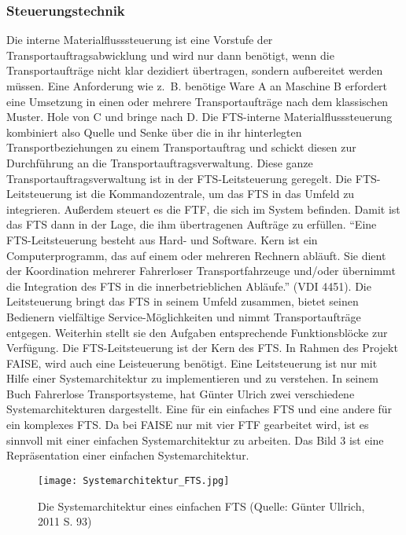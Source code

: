 \subsubsection{Steuerungstechnik}
Die interne Materialflusssteuerung ist eine Vorstufe der Transportauftragsabwicklung und wird nur dann ben\"otigt, wenn die Transportauftr\"age nicht klar dezidiert \"ubertragen, sondern aufbereitet werden m\"ussen.
Eine Anforderung wie z.~B. ben\"otige Ware A an Maschine B erfordert eine Umsetzung in einen oder mehrere Transportauftr\"age nach dem klassischen Muster.
Hole von C und bringe nach D.
Die FTS-interne Materialflusssteuerung kombiniert also Quelle und Senke \"uber die in ihr hinterlegten Transportbeziehungen zu einem Transportauftrag und schickt diesen zur Durchf\"uhrung an die Transportauftragsverwaltung.
Diese ganze Transportauftragsverwaltung ist in der FTS-Leitsteuerung geregelt. 
Die FTS-Leitsteuerung ist die Kommandozentrale, um das FTS in das Umfeld zu integrieren.
Au\ss erdem steuert es die FTF, die sich im System befinden.
Damit ist das FTS dann in der Lage, die ihm \"ubertragenen Auftr\"age zu erf\"ullen.
"`Eine FTS-Leitsteuerung besteht aus Hard- und Software.
Kern ist ein Computerprogramm, das auf einem oder mehreren Rechnern abl\"auft.
Sie dient der Koordination mehrerer Fahrerloser Transportfahrzeuge und/oder \"ubernimmt die Integration des FTS in die innerbetrieblichen Abl\"aufe."' (VDI 4451).
Die Leitsteuerung bringt das FTS in seinem Umfeld zusammen, bietet seinen Bedienern vielf\"altige Service-M\"oglichkeiten und nimmt Transportauftr\"age entgegen.
Weiterhin stellt sie den Aufgaben entsprechende Funktionsbl\"ocke zur Verf\"ugung. 
Die FTS-Leitsteuerung ist der Kern des FTS.
In Rahmen des Projekt FAISE, wird auch eine Leisteuerung ben\"otigt.
Eine Leitsteuerung ist nur mit Hilfe einer Systemarchitektur zu implementieren und zu verstehen.
In seinem Buch Fahrerlose Transportsysteme, hat G\"unter Ulrich zwei verschiedene Systemarchitekturen dargestellt.
Eine f\"ur ein einfaches FTS und eine andere f\"ur ein komplexes FTS.
Da bei FAISE nur mit vier FTF gearbeitet wird, ist es sinnvoll mit einer einfachen Systemarchitektur zu arbeiten.
Das Bild 3 ist eine Repr\"asentation einer einfachen Systemarchitektur.
	\begin{figure}[h!]
		\centering
		\texttt{[image: Systemarchitektur\_FTS.jpg]}
		\caption{Die Systemarchitektur eines einfachen FTS (Quelle: G\"unter Ullrich, 2011 S. 93)}
		\label{Systemarchitektur_FTS}
	\end{figure}

